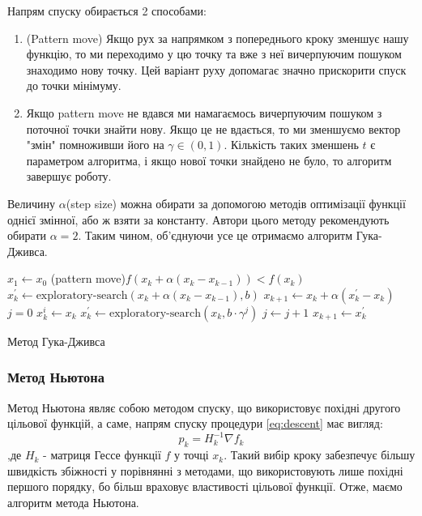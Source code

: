 Напрям спуску обирається 2 способами:
\begin{enumerate}
    \item (Pattern move) Якщо рух за напрямком з попереднього кроку
    зменшує нашу функцію, то ми переходимо у цю точку та вже з неї
    вичерпуючим пошуком знаходимо нову точку. Цей варіант руху допомагає
    значно прискорити спуск до точки мінімуму.
    \item Якщо pattern move не вдався ми намагаємось вичерпуючим
    пошуком з поточної точки знайти нову. Якщо це не вдається, то
    ми зменшуємо вектор "змін" помноживши його на $\gamma \in (0,1)$.
    Кількість таких зменшень $t$ є параметром алгоритма, і якщо
    нової точки знайдено не було, то алгоритм завершує роботу.
\end{enumerate}

Величину $\alpha$(step size) можна обирати за допомогою методів
оптимізації функції однієї змінної, або ж взяти за константу.
Автори цього методу рекомендують обирати $\alpha = 2$.
Таким чином, об'єднуючи усе це отримаємо алгоритм Гука-Дживса.

\pagebreak
{}
\begin{algorithm}[H] \label{alg:hooke_jeeves}
    \SetAlgoLined
    $x_1 \leftarrow x_0$\;
    {
        \If(pattern move){$f(x_k + \alpha (x_k - x_{k-1})) < f(x_k)$}
        {
            $x^{'}_k \leftarrow \text{exploratory-search} (x_k + \alpha (x_k - x_{k-1}), b)$ \;
            $x_{k+1} \leftarrow x_k + \alpha (x^{'}_{k} - x_{k})$ \;
        }
        \Else
        {
            $j = 0$ \;
            $x^{i}_{k} \leftarrow x_k$ \;
            {
                $x^{'}_k \leftarrow \text{exploratory-search} (x_k, b \cdot \gamma^{j})$ \;
                $ j \leftarrow j + 1 $ \;
            }
            {
            \Break
            }
            \Else
            {
                $ x_{k+1} \leftarrow x^{'}_k $ \;
            }
        }
    }
    \caption{Метод Гука-Дживса}
\end{algorithm}

\subsubsection*{Метод Ньютона}

Метод Ньютона являє собою методом спуску, що використовує
похідні другого цільової функцій, а саме, напрям спуску
процедури \ref{eq:descent} має вигляд:
\begin{equation}
    p_k = H^{-1}_k \nabla f_k
\end{equation} \label{eq:newton}
,де $H_k$ - матриця Гессе функції $f$ у точці $x_k$.
Такий вибір кроку забезпечує більшу швидкість збіжності у
порівнянні з методами, що використовують лише похідні першого порядку,
бо більш враховує властивості цільової функції.
Отже, маємо алгоритм метода Ньютона.


